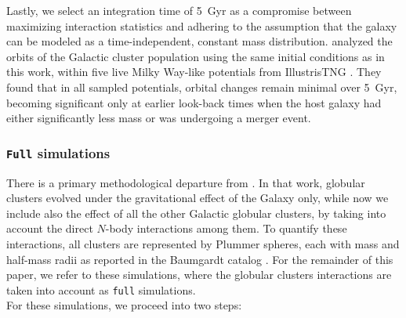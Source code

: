 \documentclass{aa}
\begin{document}
    Lastly, we select an integration time of 5~Gyr as a compromise between maximizing interaction statistics and adhering to the assumption that the galaxy can be modeled as a time-independent, constant mass distribution. \citet{2023A&A...673A.152I} analyzed the orbits of the Galactic cluster population using the same initial conditions as in this work, within five live Milky Way-like potentials from IllustrisTNG \citep{2018MNRAS.473.4077P}. They found that in all sampled potentials, orbital changes remain minimal over 5~Gyr, becoming significant only at earlier look-back times when the host galaxy had either significantly less mass or was undergoing a merger event.




    \subsubsection*{ \texttt{Full} simulations}
    There is a primary methodological departure from \citet{2023A&A...673A..44F}.  In that work, globular clusters evolved under the gravitational effect of the Galaxy only, while now we include also the effect of all the other Galactic globular clusters, by taking into account the direct $N$-body interactions among them. To quantify these interactions, all clusters are represented by Plummer spheres, each with mass and half-mass radii as reported in the Baumgardt catalog \citep{2021MNRAS.505.5957B}. For the remainder of this paper, we refer to these simulations, where the globular clusters interactions are taken into account as \texttt{full} simulations. \\
    For these simulations, we proceed into two steps:
\end{document}
